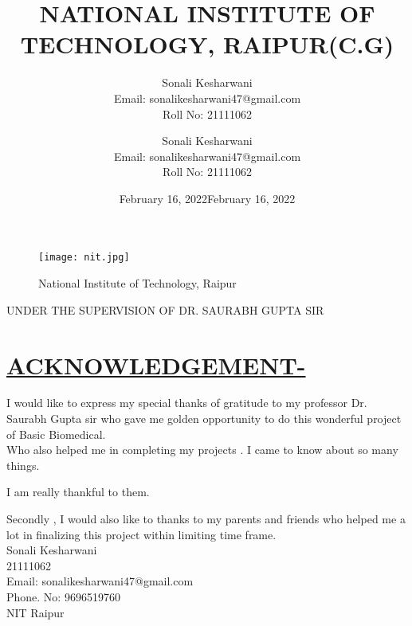 \documentclass[12pts]{article}
\title{\textbf{NATIONAL INSTITUTE OF TECHNOLOGY, RAIPUR(C.G)}}
\author{Sonali Kesharwani\\Email: sonalikesharwani47@gmail.com\\Roll No: 21111062}
\date{February 16, 2022}
\begin{document}
\maketitle

\begin{figure}[h]
\centering
\texttt{[image: nit.jpg]}
\caption{National Institute of Technology, Raipur}
\end{figure}
\centering

UNDER THE SUPERVISION OF DR. SAURABH GUPTA SIR\\
\author{Sonali Kesharwani\\Email: sonalikesharwani47@gmail.com\\Roll No: 21111062}
\date{February 16, 2022}

\clearpage

\section*{\underline{ACKNOWLEDGEMENT-}}
\begin{Large}
\raggedright
I would like to express my special thanks of 
gratitude to my professor Dr. Saurabh Gupta sir who gave me 
golden opportunity to do this wonderful project of Basic Biomedical.\\
Who also helped me in completing my projects . I came 
to know about so many things.\\
\raggedright
I am really thankful to them.
\raggedright Secondly , I would also like to thanks to my parents and friends who helped me a lot in finalizing this project within 
limiting time frame.\\
\raggedleft
Sonali Kesharwani\\
21111062\\
Email: sonalikesharwani47@gmail.com\\
Phone. No: 9696519760\\
NIT Raipur

\end{Large}
\clearpage
\end{document}
